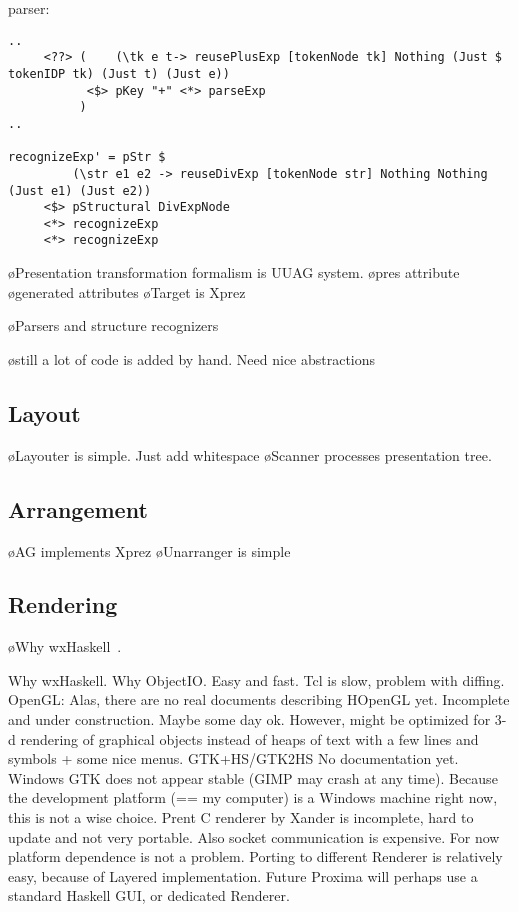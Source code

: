 parser:
\begin{verbatim}
..
     <??> (    (\tk e t-> reusePlusExp [tokenNode tk] Nothing (Just $ tokenIDP tk) (Just t) (Just e))
           <$> pKey "+" <*> parseExp 
          )
..

recognizeExp' = pStr $ 
         (\str e1 e2 -> reuseDivExp [tokenNode str] Nothing Nothing (Just e1) (Just e2))
     <$> pStructural DivExpNode
     <*> recognizeExp
     <*> recognizeExp

\end{verbatim}

\bl
\o Presentation transformation formalism is UUAG system.
\o pres attribute
\o generated attributes
\o Target is {\sc Xprez}
\el

\bl
\o Parsers and structure recognizers
\el

\bl
\o still a lot of code is added by hand. Need nice abstractions
\el
\subsection{Layout}

\bl
\o Layouter is simple. Just add whitespace
\el
\bl
\o Scanner processes presentation tree.
\el

\subsection{Arrangement}

\bl
\o AG implements Xprez
\o Unarranger is simple
\el

\subsection{Rendering}

\bl
\o Why wxHaskell~\cite{wxHaskell}.
\el

\bc
Why wxHaskell.
Why ObjectIO. 
Easy and fast.
Tcl is slow, problem with diffing. 
OpenGL: Alas, there are no real documents describing HOpenGL yet. Incomplete and under construction. Maybe some day ok. However, might be optimized for 3-d rendering of graphical objects instead of heaps of text with a few lines and symbols + some nice menus.
GTK+HS/GTK2HS No documentation yet. Windows GTK does not appear stable (GIMP may crash at any time). Because the development platform (== my computer) is a Windows machine right now, this is not a wise choice.
Prent C renderer by Xander is incomplete, hard to update and not very portable. Also socket communication is expensive.
For now platform dependence is not a problem.
Porting to different Renderer is relatively easy, because of Layered implementation.
Future Proxima will perhaps use a standard Haskell GUI, or dedicated Renderer.
\ec

